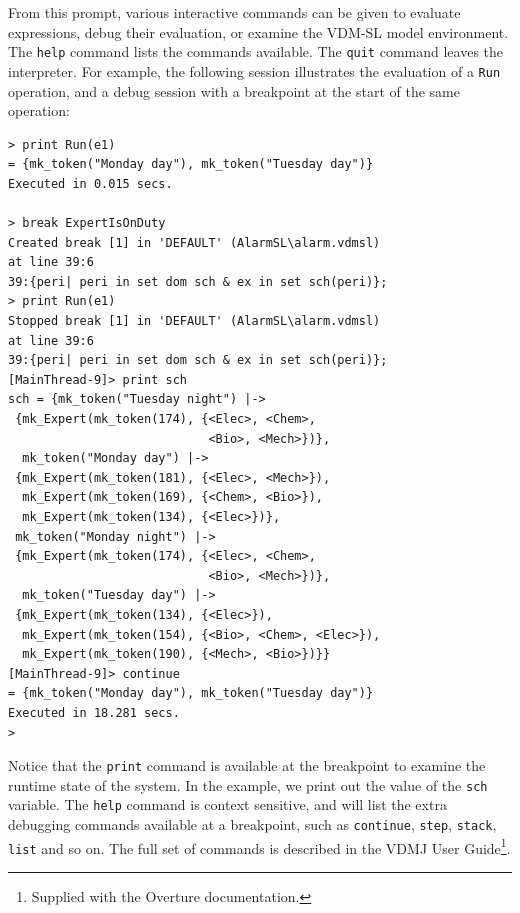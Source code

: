 \noindent From this prompt, various interactive commands can be given
to evaluate expressions, debug their evaluation, or examine the
VDM-SL model environment.  The \verb|help| command lists the commands
available. The \verb|quit| command leaves the interpreter.
For example, the following session illustrates the evaluation of a
\verb|Run| operation, and a debug session with a breakpoint at the
start of the same operation:

\begin{lstlisting}
> print Run(e1)
= {mk_token("Monday day"), mk_token("Tuesday day")}
Executed in 0.015 secs.

> break ExpertIsOnDuty
Created break [1] in 'DEFAULT' (AlarmSL\alarm.vdmsl) 
at line 39:6
39:{peri| peri in set dom sch & ex in set sch(peri)};
> print Run(e1)
Stopped break [1] in 'DEFAULT' (AlarmSL\alarm.vdmsl) 
at line 39:6
39:{peri| peri in set dom sch & ex in set sch(peri)};
[MainThread-9]> print sch
sch = {mk_token("Tuesday night") |->
 {mk_Expert(mk_token(174), {<Elec>, <Chem>, 
                            <Bio>, <Mech>})},
  mk_token("Monday day") |->
 {mk_Expert(mk_token(181), {<Elec>, <Mech>}),
  mk_Expert(mk_token(169), {<Chem>, <Bio>}),
  mk_Expert(mk_token(134), {<Elec>})},
 mk_token("Monday night") |->
 {mk_Expert(mk_token(174), {<Elec>, <Chem>, 
                            <Bio>, <Mech>})},
  mk_token("Tuesday day") |->
 {mk_Expert(mk_token(134), {<Elec>}),
  mk_Expert(mk_token(154), {<Bio>, <Chem>, <Elec>}),
  mk_Expert(mk_token(190), {<Mech>, <Bio>})}}
[MainThread-9]> continue
= {mk_token("Monday day"), mk_token("Tuesday day")}
Executed in 18.281 secs. 
> 
\end{lstlisting}

\noindent Notice that the \verb|print| command is available at the
breakpoint to examine the runtime state of the system. In the example,
we print out the value of the \verb|sch| variable. The \verb|help|
command is context sensitive, and will list the extra debugging
commands available at a breakpoint, such as \verb|continue|,
\verb|step|, \verb|stack|, \verb|list| and so on. The full set of
commands is described in the VDMJ User Guide\footnote{Supplied with
the Overture documentation.}.

%
\lstset{style=mystyle}

